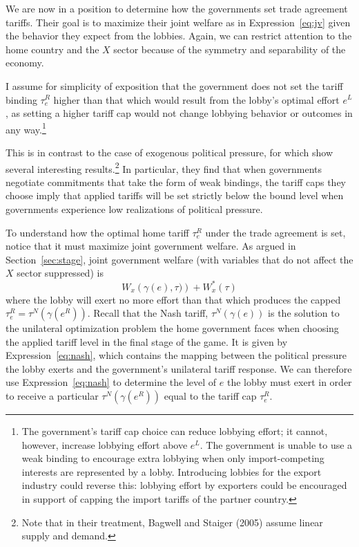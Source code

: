 \documentclass[12pt]{article}
\newcommand{\ga}{\gamma}
\begin{document}
We are now in a position to determine how the governments set trade agreement tariffs. Their goal is to maximize their joint welfare as in Expression~\ref{eq:jv} given the behavior they expect from the lobbies. Again, we can restrict attention to the home country and the $X$ sector because of the symmetry and separability of the economy.

I assume for simplicity of exposition that the government does not set the tariff binding $\tau_e^R$ higher than that which would result from the lobby's optimal effort $e^L$, as setting a higher tariff cap would not change lobbying behavior or outcomes in any way.\footnote{The government's tariff cap choice can reduce lobbying effort; it cannot, however, increase lobbying effort above $e^L$. The government is unable to use a weak binding to encourage extra lobbying when only import-competing interests are represented by a lobby. Introducing lobbies for the export industry could reverse this: lobbying effort by exporters could be encouraged in support of capping the import tariffs of the partner country.}

This is in contrast to the case of exogenous political pressure, for which \Textcite{bs2005} show several interesting results.\footnote{Note that in their treatment, Bagwell and Staiger (2005) assume linear supply and demand.} In particular, they find that when governments negotiate commitments that take the form of weak bindings, the tariff caps they choose imply that applied tariffs will be set strictly below the bound level when governments experience low realizations of political pressure.

To understand how the optimal home tariff $\tau_e^R$ under the trade agreement is set, notice that it must maximize joint government welfare. As argued in Section~\ref{sec:stage}, joint government welfare (with variables that do not affect the $X$ sector suppressed) is
  \begin{equation}
		W_x \left(\ga(e),\tau) \right) + W_x^*\left(\tau \right)
	  \label{exp:1}
	\end{equation}
where the lobby will exert no more effort than that which produces the capped $\tau_e^R=\tau^N(\ga(e^R))$. Recall that the Nash tariff, $\tau^N(\ga(e))$ is the solution to the unilateral optimization problem the home government faces when choosing the applied tariff level in the final stage of the game. It is given by Expression~\ref{eq:nash}, which contains the mapping between the political pressure the lobby exerts and the government's unilateral tariff response. We can therefore use Expression~\ref{eq:nash} to determine the level of $e$ the lobby must exert in order to receive a particular $\tau^N(\ga(e^R))$ equal to the tariff cap $\tau_e^R$.
\end{document}
